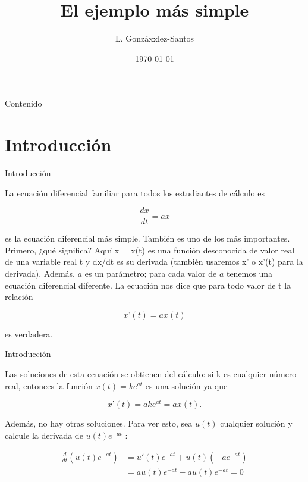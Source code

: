 \documentclass[11pt]{beamer}
\author[santosg172@gmail.com]{L. Gonzáxxlez-Santos\inst{1}}
\title[Aplicación a la IA]{El ejemplo más simple}
\date{\today}
\begin{document}
	
	\begin{frame}
		\maketitle
	\end{frame}

	\begin{frame}{Contenido}
		\tableofcontents
	\end{frame}

	
	\section{Introducción}
		
		\begin{frame}{Introducción}
			\justifying
			
La ecuación diferencial familiar para todos los estudiantes de cálculo es

\[
\frac{dx}{dt} = ax
\]

es la ecuación diferencial más simple. También es uno de los más importantes. Primero, ¿qué significa? Aquí x = x(t) es una función desconocida de valor real de una variable real t y dx/dt es su derivada (también usaremos x’ o x’(t) para la derivada). Además, $a$ es un parámetro; para cada valor de $a$ tenemos una ecuación diferencial diferente. La ecuación nos dice que para todo valor de t la relación

\[
x’(t ) = ax(t)
\]

es verdadera.


		\end{frame}



\begin{frame}{Introducción}
			\justifying

Las soluciones de esta ecuación se obtienen del cálculo: si k es cualquier número real, entonces la función $x(t) = ke^{at}$ es una solución ya que

\[
x’(t) = ake^{at} = ax(t).
\]

Además, no hay otras soluciones. Para ver esto, sea $u(t)$ cualquier solución y calcule la derivada de $u(t)e^{-at}$ :

\begin{align*}
\frac{d}{dt} (u(t) e^{-at}) &= u'(t) e^{-at} + u(t) (-a e^{-at}) \\
&= au(t) e^{-at} - au(t) e^{-at} = 0
\end{align*}



			
\end{frame}
\end{document}
